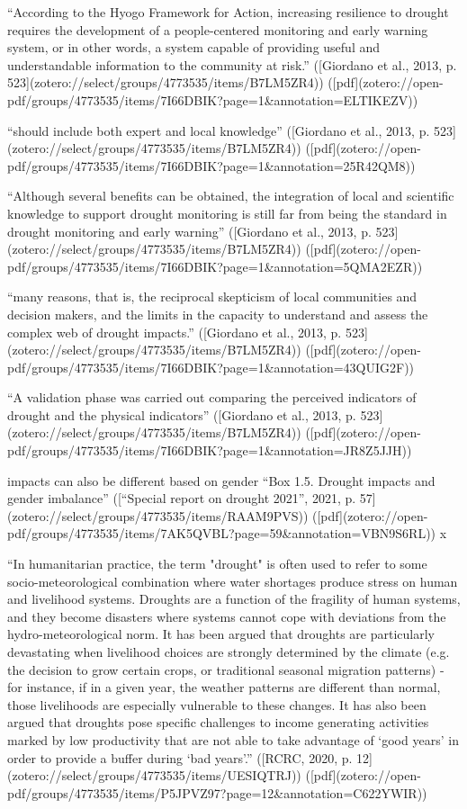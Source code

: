 {“According to the Hyogo Framework for Action, increasing resilience to drought requires the development of a people-centered monitoring and early warning system, or in other words, a system capable of providing useful and understandable information to the community at risk.” ([Giordano et al., 2013, p. 523](zotero://select/groups/4773535/items/B7LM5ZR4)) ([pdf](zotero://open-pdf/groups/4773535/items/7I66DBIK?page=1&annotation=ELTIKEZV))

“should include both expert and local knowledge” ([Giordano et al., 2013, p. 523](zotero://select/groups/4773535/items/B7LM5ZR4)) ([pdf](zotero://open-pdf/groups/4773535/items/7I66DBIK?page=1&annotation=25R42QM8))

“Although several benefits can be obtained, the integration of local and scientific knowledge to support drought monitoring is still far from being the standard in drought monitoring and early warning” ([Giordano et al., 2013, p. 523](zotero://select/groups/4773535/items/B7LM5ZR4)) ([pdf](zotero://open-pdf/groups/4773535/items/7I66DBIK?page=1&annotation=5QMA2EZR))

“many reasons, that is, the reciprocal skepticism of local communities and decision makers, and the limits in the capacity to understand and assess the complex web of drought impacts.” ([Giordano et al., 2013, p. 523](zotero://select/groups/4773535/items/B7LM5ZR4)) ([pdf](zotero://open-pdf/groups/4773535/items/7I66DBIK?page=1&annotation=43QUIG2F))

“A validation phase was carried out comparing the perceived indicators of drought and the physical indicators” ([Giordano et al., 2013, p. 523](zotero://select/groups/4773535/items/B7LM5ZR4)) ([pdf](zotero://open-pdf/groups/4773535/items/7I66DBIK?page=1&annotation=JR8Z5JJH))

impacts can also be different based on gender “Box 1.5. Drought impacts and gender imbalance” ([“Special report on drought 2021”, 2021, p. 57](zotero://select/groups/4773535/items/RAAM9PVS)) ([pdf](zotero://open-pdf/groups/4773535/items/7AK5QVBL?page=59&annotation=VBN9S6RL)) x

“In humanitarian practice, the term "drought" is often used to refer to some socio-meteorological combination where water shortages produce stress on human and livelihood systems. Droughts are a function of the fragility of human systems, and they become disasters where systems cannot cope with deviations from the hydro-meteorological norm. It has been argued that droughts are particularly devastating when livelihood choices are strongly determined by the climate (e.g. the decision to grow certain crops, or traditional seasonal migration patterns) - for instance, if in a given year, the weather patterns are different than normal, those livelihoods are especially vulnerable to these changes. It has also been argued that droughts pose specific challenges to income generating activities marked by low productivity that are not able to take advantage of ‘good years’ in order to provide a buffer during ‘bad years’.” ([RCRC, 2020, p. 12](zotero://select/groups/4773535/items/UESIQTRJ)) ([pdf](zotero://open-pdf/groups/4773535/items/P5JPVZ97?page=12&annotation=C622YWIR))

}
